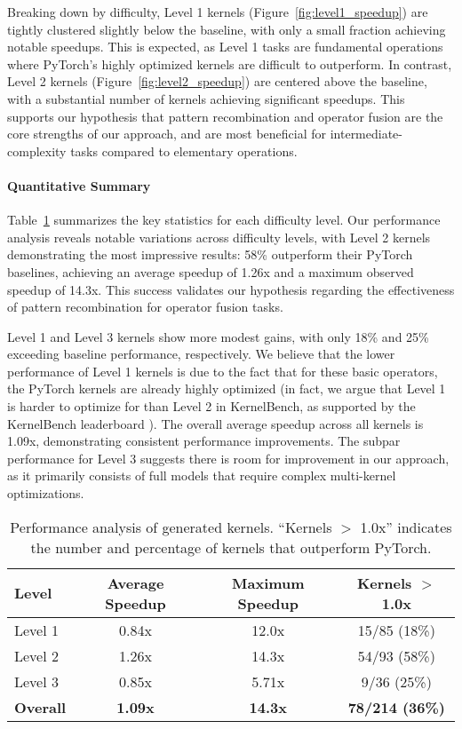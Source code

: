 \documentclass{article}
\begin{document}
Breaking down by difficulty, Level 1 kernels (Figure~\ref{fig:level1_speedup}) are tightly clustered slightly below the baseline, with only a small fraction achieving notable speedups. This is expected, as Level 1 tasks are fundamental operations where PyTorch's highly optimized kernels are difficult to outperform. In contrast, Level 2 kernels (Figure~\ref{fig:level2_speedup}) are centered above the baseline, with a substantial number of kernels achieving significant speedups. This supports our hypothesis that pattern recombination and operator fusion are the core strengths of our approach, and are most beneficial for intermediate-complexity tasks compared to elementary operations.

\paragraph{Quantitative Summary}
Table~\ref{tab:performance} summarizes the key statistics for each difficulty level. Our performance analysis reveals notable variations across difficulty levels, with Level 2 kernels demonstrating the most impressive results: 58\% outperform their PyTorch baselines, achieving an average speedup of 1.26x and a maximum observed speedup of 14.3x. This success validates our hypothesis regarding the effectiveness of pattern recombination for operator fusion tasks.

Level 1 and Level 3 kernels show more modest gains, with only 18\% and 25\% exceeding baseline performance, respectively. We believe that the lower performance of Level 1 kernels is due to the fact that for these basic operators, the PyTorch kernels are already highly optimized (in fact, we argue that Level 1 is harder to optimize for than Level 2 in KernelBench, as supported by the KernelBench leaderboard \cite{kernelsseum2024}). The overall average speedup across all kernels is 1.09x, demonstrating consistent performance improvements. The subpar performance for Level 3 suggests there is room for improvement in our approach, as it primarily consists of full models that require complex multi-kernel optimizations.
\begin{table}[h]
\centering
\caption{Performance analysis of generated kernels. ``Kernels $>$ 1.0x'' indicates the number and percentage of kernels that outperform PyTorch.}
\label{tab:performance}
\begin{tabular}{lccc}
\toprule
\textbf{Level} & \textbf{Average Speedup} & \textbf{Maximum Speedup} & \textbf{Kernels $>$ 1.0x} \\
\midrule
Level 1 & 0.84x & 12.0x & 15/85 (18\%) \\
Level 2 & 1.26x & 14.3x & 54/93 (58\%) \\
Level 3 & 0.85x & 5.71x & 9/36 (25\%) \\
\textbf{Overall} & \textbf{1.09x} & \textbf{14.3x} & \textbf{78/214 (36\%)} \\
\bottomrule
\end{tabular}
\end{table}
\end{document}
